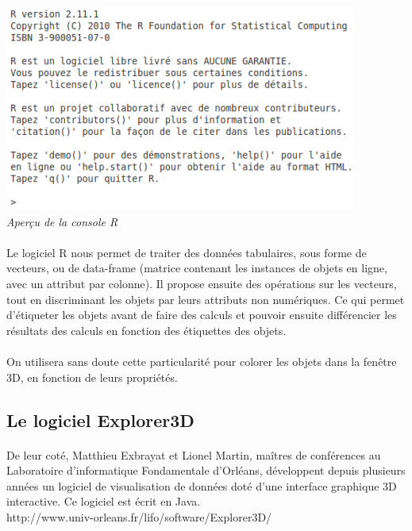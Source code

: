 \begin{center}
\includegraphics[scale=0.7]{demarrage_r.png}\\
\textit{Aperçu de la console R}
\end{center}
\newpage
\paragraph{} 
Le logiciel R nous permet de traiter des données tabulaires, sous forme de vecteurs, ou de data-frame (matrice contenant les instances de objets en ligne, avec un attribut par colonne). Il propose ensuite des opérations sur les vecteurs, tout en discriminant les objets par leurs attributs non numériques. Ce qui permet d’étiqueter les objets avant de faire des calculs et pouvoir ensuite différencier les résultats des calculs en fonction des étiquettes des objets.

\paragraph{} On utilisera sans doute cette particularité pour colorer les objets dans la fenêtre 3D, en fonction de leurs propriétés.

\newpage

\subsection{Le logiciel Explorer3D}
\paragraph{}
De leur coté, Matthieu Exbrayat et Lionel Martin, maîtres de conférences au Laboratoire d'informatique Fondamentale d'Orléans, développent depuis plusieurs années un logiciel de visualisation de données
doté d'une interface graphique 3D interactive. Ce logiciel est écrit en Java.\\
http://www.univ-orleans.fr/lifo/software/Explorer3D/

